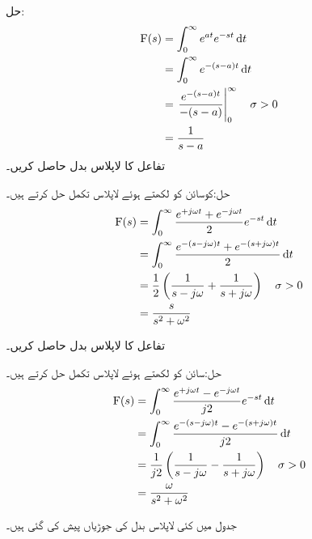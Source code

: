 حل:
\begin{align*}
\bF(s)&=\int_0^{\infty} e^{at} e^{-st} \dif t\\
&=\int_0^{\infty} e^{-(s-a)t} \dif t\\
&=\left. \frac{e^{-(s-a)t}}{-(s-a)}\right|_0^{\infty} \quad \sigma>0\\
&=\frac{1}{s-a}
\end{align*}
تفاعل  کا لاپلاس بدل حاصل کریں۔

حل:کوسائن کو  لکھتے ہوئے لاپلاس تکمل حل کرتے ہیں۔
\begin{align*}
\bF(s)&=\int_0^{\infty} \frac{e^{+j\omega t}+e^{-j\omega t}}{2} e^{-st} \dif t\\
&=\int_0^{\infty} \frac{e^{-(s-j\omega)t}+e^{-(s+j\omega)t}}{2} \dif t\\
&=\frac{1}{2}\left(\frac{1}{s-j\omega}+\frac{1}{s+j\omega}\right) \quad \sigma>0\\
&=\frac{s}{s^2+\omega^2}
\end{align*}

تفاعل  کا لاپلاس بدل حاصل کریں۔

حل:سائن کو  لکھتے ہوئے لاپلاس تکمل حل کرتے ہیں۔
\begin{align*}
\bF(s)&=\int_0^{\infty} \frac{e^{+j\omega t}-e^{-j\omega t}}{j2} e^{-st} \dif t\\
&=\int_0^{\infty} \frac{e^{-(s-j\omega)t}-e^{-(s+j\omega)t}}{j2} \dif t\\
&=\frac{1}{j2}\left(\frac{1}{s-j\omega}-\frac{1}{s+j\omega}\right) \quad \sigma>0\\
&=\frac{\omega}{s^2+\omega^2}
\end{align*}

جدول میں کئی لاپلاس بدل کی جوڑیاں پیش کی گئی ہیں۔
